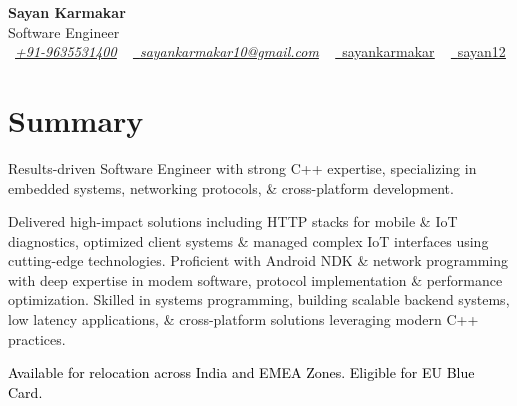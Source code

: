 \documentclass[a4paper,11pt]{article}
\begin{document}
%

\begin{center}
    {\Huge \bfseries \color{metacolor} Sayan Karmakar} \\ \vspace{1pt} Software Engineer \\ \vspace{1pt}
    \small 
    \raisebox{-0.1\height}\faPhone\ \href{https://wa.me/919635531400}{\textit{\underline{+91-9635531400}}} ~ 
    \href{mailto:sayankarmakar10@gmail.com}{\raisebox{-0.2\height}\faEnvelope\ \textit{\underline{sayankarmakar10@gmail.com}}} ~
    \href{https://www.linkedin.com/in/sayankarmakar/}{\raisebox{-0.2\height}\faLinkedin\ \underline{sayankarmakar}} ~
    \href{https://github.com/sayan12}{\raisebox{-0.2\height}\faGithub\ \underline{sayan12}}
    \vspace{-15pt}
\end{center}

\section{Summary}
\begin{itemize}[leftmargin=0.15in, label=, itemsep=2pt, topsep=2pt, parsep=0pt]
    \small{\item{
        \justifying Results-driven Software Engineer with strong C++ expertise, specializing in embedded systems, networking protocols, \& cross-platform development.
    }}
    \small{\item{
        \justifying Delivered high-impact solutions including HTTP stacks for mobile \& IoT diagnostics, optimized client systems \& managed complex IoT interfaces using cutting-edge technologies. Proficient with Android NDK \& network programming with deep expertise in modem software, protocol implementation \& performance optimization. Skilled in systems programming, building scalable backend systems, low latency applications, \& cross-platform solutions leveraging modern C++ practices.
    }}
    \small{\item{
        \justifying \textcolor{black}{Available for relocation across India and EMEA Zones. Eligible for \textcolor{qccolor}{EU Blue Card.}}
    }}
\end{itemize}
\vspace{-13.5pt}
\end{document}
